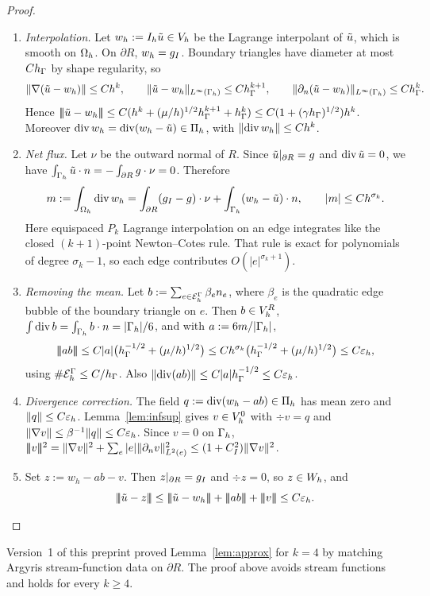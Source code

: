 \begin{proof}
\begin{enumerate}
\item \emph{Interpolation.} Let $w_h:=I_h\tilde u\in V_h$ be the Lagrange interpolant of $\tilde u$, which is smooth on $\Omega_h$. On $\partial R$, $w_h=g_I$. Boundary triangles have diameter at most $Ch_\Gamma$ by shape regularity, so
\[
\lVert \nabla(\tilde u-w_h)\rVert\le Ch^k,\qquad \lVert \tilde u-w_h\rVert_{L^\infty(\Gamma_h)}\le Ch_\Gamma^{k+1},\qquad \lVert \partial_n(\tilde u-w_h)\rVert_{L^\infty(\Gamma_h)}\le Ch_\Gamma^{k}.
\]
Hence $|\!|\!|\tilde u-w_h|\!|\!|\le C(h^k+(\mu/h)^{1/2}h_\Gamma^{k+1}+h_\Gamma^k)\le C(1+(\gamma h_\Gamma)^{1/2})h^k$. Moreover $\operatorname{div} w_h=\operatorname{div}(w_h-\tilde u)\in\Pi_h$, with $\lVert \operatorname{div} w_h\rVert\le Ch^k$.
\item \emph{Net flux.} Let $\nu$ be the outward normal of $R$. Since $\tilde u|_{\partial R}=g$ and $\operatorname{div}\tilde u=0$, we have $\int_{\Gamma_h}\tilde u\cdot n=-\int_{\partial R}g\cdot\nu=0$. Therefore
\[
m:=\int_{\Omega_h}\operatorname{div} w_h=\int_{\partial R}(g_I-g)\cdot\nu+\int_{\Gamma_h}(w_h-\tilde u)\cdot n,
\qquad |m|\le Ch^{\sigma_k}.
\]
Here equispaced $P_k$ Lagrange interpolation on an edge integrates like the closed $(k+1)$-point Newton--Cotes rule. That rule is exact for polynomials of degree $\sigma_k-1$, so each edge contributes $O(|e|^{\sigma_k+1})$.
\item \emph{Removing the mean.} Let $b:=\sum_{e\in\mathcal E_h^\Gamma}\beta_en_e$, where $\beta_e$ is the quadratic edge bubble of the boundary triangle on $e$. Then $b\in V_h^R$, $\int\operatorname{div} b=\int_{\Gamma_h}b\cdot n=|\Gamma_h|/6$, and with $a:=6m/|\Gamma_h|$,
\[
|\!|\!|ab|\!|\!|\le C|a|\bigl(h_\Gamma^{-1/2}+(\mu/h)^{1/2}\bigr)\le Ch^{\sigma_k}\bigl(h_\Gamma^{-1/2}+(\mu/h)^{1/2}\bigr)\le C\varepsilon_h,
\]
using $\#\mathcal E_h^\Gamma\le C/h_\Gamma$. Also $\lVert \operatorname{div}(ab)\rVert\le C|a|h_\Gamma^{-1/2}\le C\varepsilon_h$.
\item \emph{Divergence correction.} The field $q:=\operatorname{div}(w_h-ab)\in\Pi_h$ has mean zero and $\lVert q\rVert\le C\varepsilon_h$. Lemma~\ref{lem:infsup} gives $v\in V_h^0$ with $\div v=q$ and $\lVert \nabla v\rVert\le\beta^{-1}\lVert q\rVert\le C\varepsilon_h$. Since $v=0$ on $\Gamma_h$, $|\!|\!|v|\!|\!|^2=\lVert \nabla v\rVert^2+\sum_e|e|\lVert \partial_n v\rVert^2_{L^2(e)}\le(1+C_I^2)\lVert \nabla v\rVert^2$.
\item Set $z:=w_h-ab-v$. Then $z|_{\partial R}=g_I$ and $\div z=0$, so $z\in W_h$, and
\[
\tnorm{\ut-z}\le\tnorm{\ut-w_h}+\tnorm{ab}+\tnorm{v}\le C\eps.\qedhere
\]
\end{enumerate}
\end{proof}

\begin{remark}
Version~1 of this preprint proved Lemma~\ref{lem:approx} for $k=4$ by matching Argyris stream-function data on $\partial R$. The proof above avoids stream functions and holds for every $k\ge4$.
\end{remark}
